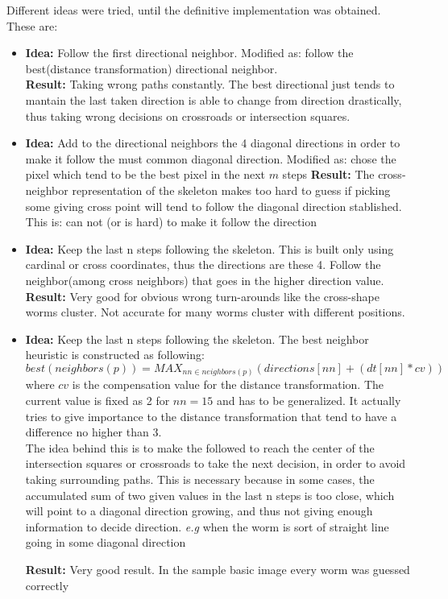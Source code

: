 \documentclass{article}
\begin{document}
Different ideas were tried, until the definitive implementation was obtained. These are:
\begin{itemize}
\item \textbf{Idea: } Follow the first directional neighbor. Modified as: follow the best(distance transformation) directional neighbor.\\
  \textbf{Result: }Taking wrong paths constantly. The best directional just tends to mantain the last taken direction is able to change
  from direction drastically, thus taking wrong decisions on crossroads or intersection squares.

\item \textbf{Idea: } Add to the directional neighbors the 4 diagonal directions in order to make it follow the must common diagonal direction.
  Modified as: chose the pixel which tend to be the best pixel in the next $m$ steps
  \textbf{Result: } The cross-neighbor representation of the skeleton makes too hard to guess if picking some giving cross point will tend 
  to follow the diagonal direction stablished. This is: can not (or is hard) to make it follow the direction

\item \textbf{Idea: }Keep the last n steps following the skeleton. This is built only using cardinal or cross coordinates, thus the directions
  are these 4. Follow the neighbor(among cross neighbors) that goes in the higher direction value.\\
  \textbf{Result: } Very good for obvious wrong turn-arounds like the cross-shape worms cluster. Not accurate for many worms cluster with different
  positions.

\item \textbf{Idea: }Keep the last n steps following the skeleton. The best neighbor heuristic is constructed as following:
$$best(neighbors(p)) = MAX_{nn \in neighbors(p)}(directions[nn]+(dt[nn]*cv))$$ where $cv$ is the compensation value for the distance
transformation. The current value is fixed as 2 for $nn=15$ and has to be generalized. It actually tries to give importance to the distance
transformation that tend to have a difference no higher than 3.\\
The idea behind this is to make the followed to reach the center of the intersection squares or crossroads to take the next decision, in order to
avoid taking surrounding paths. This is necessary because in some cases, the accumulated sum of two given values in the last n steps is too close, which
will point to a diagonal direction growing, and thus not giving enough information to decide direction.
\emph{e.g} when the worm is sort of straight line going in some diagonal direction

\textbf{Result: }Very good result. In the sample basic image every worm was guessed correctly
\end{itemize}
\end{document}

